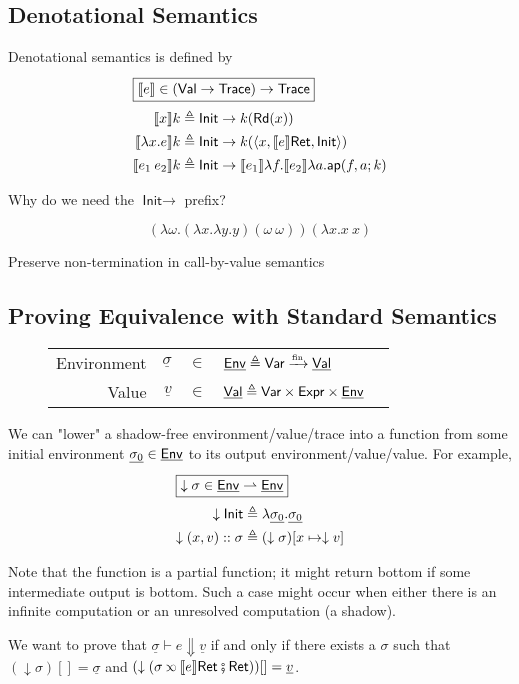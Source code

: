 \subsection{Denotational Semantics}
Denotational semantics is defined by
\begin{alignat*}{2}
  \intertext{\hfill\fbox{$\sembracket{e}\in(\Value\to\textsf{Trace})\to\textsf{Trace}$}}
  \sembracket{x}k           & \triangleq\textsf{Init}\rightarrow k(\textsf{Rd}(x))                                                     \\
  \sembracket{\lambda x.e}k & \triangleq\textsf{Init}\rightarrow k(\langle x,\sembracket{e}\textsf{Ret},\textsf{Init}\rangle)          \\
  \sembracket{e_1\:e_2}k    & \triangleq\textsf{Init}\rightarrow\sembracket{e_1}\lambda f.\sembracket{e_2}\lambda a.\textsf{ap}(f,a;k)
\end{alignat*}

Why do we need the $\textsf{Init}\rightarrow$ prefix?

\[(\lambda\omega.(\lambda x.\lambda y.y)(\omega\:\omega))(\lambda x.x\:x)\]

Preserve non-termination in call-by-value semantics

\subsection{Proving Equivalence with Standard Semantics}

\begin{figure}[h]
  \small
  \begin{tabular}{rrcll}
    Environment & $\underline{\sigma}$ & $\in$ & $\underline{\mathsf{Env}}\triangleq{\textsf{Var}}\xrightarrow{\mbox{\tiny{fin}}}{\underline{\mathsf{Val}}}$          \\
    Value       & $\underline{v}$      & $\in$ & $\underline{\mathsf{Val}}\triangleq\textsf{Var}\times\mathsf{Expr}\times\underline{\mathsf{Env}}$
  \end{tabular}
\end{figure}

We can "lower" a shadow-free environment/value/trace into a function from some initial environment $\underline{\sigma_0}\in\underline{\mathsf{Env}}$
to its output environment/value/value.
For example,
\begin{alignat*}{2}
  \intertext{\hfill\fbox{$\downarrow\sigma\in\underline{\Ctx}\rightharpoonup\underline{\Ctx}$}}
  \downarrow\textsf{Init}    & \triangleq\lambda\underline{\sigma_0}.\underline{\sigma_0} \\
  \downarrow(x,v)\cons\sigma & \triangleq(\downarrow\sigma)[x\mapsto\downarrow v]
\end{alignat*}

Note that the function is a partial function; it might return bottom if some intermediate output is bottom.
Such a case might occur when either there is an infinite computation or an unresolved computation (a shadow).

We want to prove that $\underline{\sigma}\vdash e\Downarrow \underline{v}$ if and only if
there exists a $\sigma$ such that $(\downarrow\sigma)[]=\underline{\sigma}$ and
$(\downarrow(\sigma\semlink\sembracket{e}\textsf{Ret}\fatsemi\textsf{Ret}))[]=\underline{v}$.
